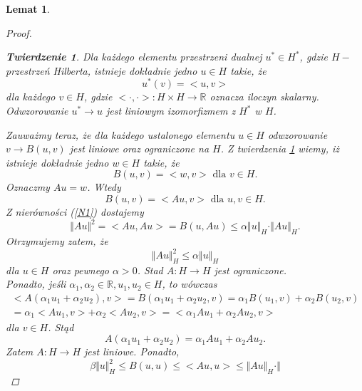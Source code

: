 \documentclass[12pt,a4paper,oneside,titlepage]{article}
\newtheorem{Twierdzenie}{Twierdzenie}
\newtheorem{Lemat}{Lemat}
\begin{document}
\begin{Lemat}
\begin{proof}
\begin{Twierdzenie} \label{TR}
Dla każdego elementu przestrzeni dualnej $u^* \in H^*$, gdzie $H-$ przestrzeń Hilberta, istnieje dokładnie jedno $u \in H$ takie, że
\begin{equation}
\nonumber
u^* (v) = <u,v>
\end{equation}
dla każdego $v \in H$, gdzie $<\cdot, \cdot >:H \times H \rightarrow \mathbb{R}$ oznacza iloczyn skalarny. Odwzorowanie $u^* \rightarrow u$ jest liniowym izomorfizmem z $H^*$ w $H$.
\end{Twierdzenie}
Zauważmy teraz, że dla każdego ustalonego elementu $u \in H$ odwzorowanie $v \rightarrow B(u,v) $ jest liniowe oraz ograniczone na $H$. Z twierdzenia \ref{TR} wiemy, iż istnieje dokładnie jedno $w \in H$ takie, że
\begin{equation}
\nonumber
B(u,v) = <w,v> \text{ dla } v \in H.
\end{equation}
Oznaczmy $Au=w$. Wtedy
\begin{equation}
B(u,v) = <Au,v> \text{ dla } u,v \in H.
\end{equation}
Z nierówności (\ref{N1}) dostajemy
\begin{equation}
\nonumber
\Vert Au \Vert^2 = <Au,Au> = B(u,Au) \leq \alpha \Vert u \Vert_H \cdot \Vert Au \Vert_H.
\end{equation}
Otrzymujemy zatem, że
\begin{equation}
\nonumber
\Vert Au \Vert_H^2 \leq \alpha \Vert u \Vert_H
\end{equation}
dla $u \in H$ oraz pewnego $\alpha >0$. Stad $A:H \rightarrow H$ jest ograniczone. \\
\indent
Ponadto, jeśli $\alpha_1, \alpha_2 \in \mathbb{R}, u_1, u_2 \in H$, to wówczas
\begin{equation}
\nonumber
\begin{split}
<A(\alpha_1 u_1 +\alpha_2 u_2), v > = B(\alpha_1 u_1 +\alpha_2 u_2, v)  = \alpha_1 B(u_1, v) + \alpha_2 B(u_2,v) \\ = \alpha_1 <Au_1,v> + \alpha_2 <Au_2,v> = < \alpha_1 A u_1 +\alpha_2 A u_2, v >
\end{split}
\end{equation}
dla $v \in H$. Stąd
\begin{equation}
\nonumber
A(\alpha_1 u_1 +\alpha_2 u_2) = \alpha_1 A u_1 +\alpha_2 A u_2.
\end{equation}
Zatem $A:H \rightarrow H$ jest liniowe.
Ponadto,
\begin{equation}
\nonumber
\beta \Vert u \Vert_H^2 \leq B(u,u) \leq <Au,u> \leq \Vert Au \Vert_H \cdot \Vert

\end{equation}
\end{proof}
\end{Lemat}
\end{document}
